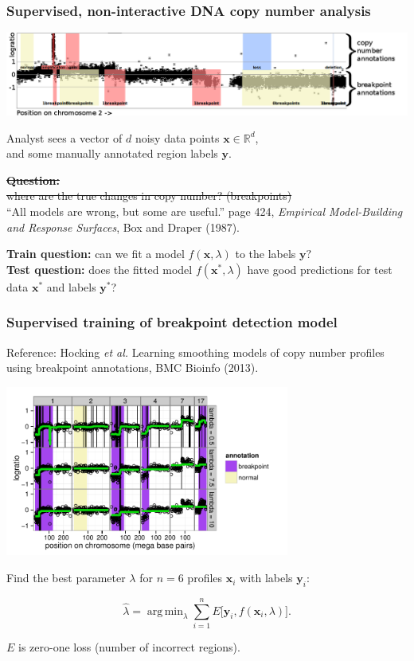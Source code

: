 \documentclass{beamer}
\DeclareMathOperator*{\argmin}{arg\,min}
\newcommand{\RR}{\mathbb R}
\begin{document}
\begin{frame}
  \frametitle{Supervised, non-interactive DNA copy number analysis}

  \includegraphics[width=\textwidth]{regions-axes-full}

  Analyst sees a vector of $d$ noisy data points $\mathbf x\in\RR^d$,\\
  and some manually annotated region labels $\mathbf y$.

  \vskip 0.1in

  \sout{\textbf{Question:}\\
    where are the true changes in copy number? (breakpoints)}
  \\
  ``All models are wrong, but some are useful.'' page 424, \textit{Empirical
    Model-Building and Response Surfaces}, Box and Draper (1987).

  \vskip 0.1in

  \textbf{Train question:} can we fit a model $f(\mathbf x, \lambda)$
  to the labels $\mathbf y?$
  \\
  \textbf{Test question:} does the fitted model $f(\mathbf x^*, \lambda)$
  have good predictions for test data $\mathbf x^*$ and labels $\mathbf y^*$?
\end{frame}

\begin{frame}
  \frametitle{Supervised training of breakpoint detection model}

  Reference: Hocking \textit{et al.} Learning smoothing models of copy
  number profiles using breakpoint annotations, BMC Bioinfo
  (2013).

  \begin{center}
      \includegraphics[width=0.7\textwidth]{bams-smoothing}
  \end{center}

  Find the best parameter $\lambda$ for $n=6$ profiles $\mathbf x_i$
  with labels $\mathbf y_i$:

  \begin{equation*}
    \hat \lambda = \argmin_{\lambda}
    \sum_{i=1}^n
    E\big[
      \mathbf y_i,
      f(\mathbf x_i, \lambda)
    \big].
  \end{equation*}

  $E$ is zero-one loss (number of incorrect regions).

\end{frame}
\end{document}
